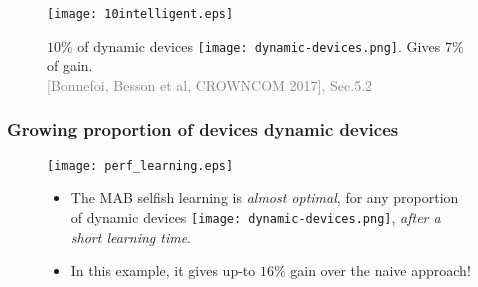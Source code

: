 \begin{frameO}

    \begin{figure}[h!]
        \centering
        \texttt{[image: 10intelligent.eps]}

            $10\%$ of dynamic devices \texttt{[image: dynamic-devices.png]}. Gives $7\%$ of gain.\\
            {\small \textcolor{gray}{[Bonnefoi, Besson et al, CROWNCOM 2017], Sec.5.2}}
    \end{figure}

\end{frameO}









\subsubsection{Growing proportion of devices dynamic devices}

\begin{frameO}

    \begin{figure}[h!]
        \centering
        \texttt{[image: perf\_learning.eps]}

            \begin{itemize}
                \item
                The MAB selfish learning is \emph{almost optimal}, for any proportion of dynamic devices \texttt{[image: dynamic-devices.png]}, \emph{after a short learning time}.

                \item
                In this example, it gives up-to $16\%$ gain over the naive approach!
            \end{itemize}
    \end{figure}

\end{frameO}


